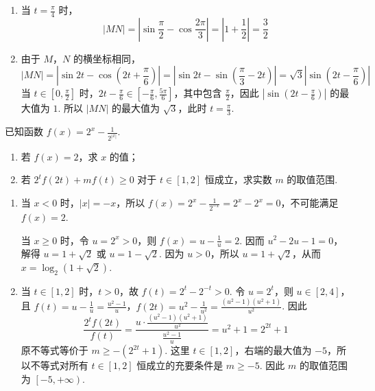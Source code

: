 \begin{solution}
\begin{enumerate}
\item 当 \(t=\frac{\pi}{4}\) 时，
\[
\lvert MN\rvert=\left|\sin\frac{\pi}{2}-\cos\frac{2\pi}{3}\right|=\left|1+\frac{1}{2}\right|=\frac{3}{2}
\]

\item 由于 \(M\)，\(N\) 的横坐标相同，
\[
\lvert MN\rvert=\left|\sin2t-\cos\left(2t+\frac{\pi}{6}\right)\right|=\left|\sin2t-\sin\left(\frac{\pi}{3}-2t\right)\right|=\sqrt{3}\left|\sin\left(2t-\frac{\pi}{6}\right)\right|
\]
当 \(t\in\left[0,\frac{\pi}{2}\right]\) 时，\(2t-\frac{\pi}{6}\in\left[-\frac{\pi}{6},\frac{5\pi}{6}\right]\)，其中包含 \(\frac{\pi}{2}\)，因此 \(\left|\sin\left(2t-\frac{\pi}{6}\right)\right|\) 的最大值为 \(1\). 所以 \(\lvert MN\rvert\) 的最大值为 \(\sqrt{3}\)，此时 \(t=\frac{\pi}{3}\).
\end{enumerate}
\end{solution}

\begin{problem}
已知函数 \(f(x) = 2^x - \frac{1}{2^{|x|}}\).

\begin{enumerate}
\item 若 \(f(x) = 2\)，求 \(x\) 的值；
\item 若 \(2^{t}f(2t) + mf(t) \geqslant 0\) 对于 \(t \in \left[1,2\right]\) 恒成立，求实数 \(m\) 的取值范围.
\end{enumerate}
\end{problem}

\begin{solution}
\begin{enumerate}
\item 当 \(x<0\) 时，\(|x|=-x\)，所以 \(f(x)=2^x-\frac{1}{2^{-x}}=2^x-2^x=0\)，不可能满足 \(f(x)=2\).

当 \(x\geqslant0\) 时，令 \(u=2^x>0\)，则 \(f(x)=u-\frac{1}{u}=2\). 因而
\(u^2-2u-1=0\)，
解得 \(u=1+\sqrt{2}\) 或 \(u=1-\sqrt{2}\). 因为 \(u>0\)，所以 \(u=1+\sqrt{2}\)，从而
\(x=\log_{2}(1+\sqrt{2})\).

\item 当 \(t\in\left[1,2\right]\) 时，\(t>0\)，故 \(f(t)=2^t-2^{-t}>0\). 令 \(u=2^t\)，则 \(u\in\left[2,4\right]\)，且 \(f(t)=u-\frac{1}{u}=\frac{u^2-1}{u}\)，\(f(2t)=u^2-\frac{1}{u^2}=\frac{(u^2-1)(u^2+1)}{u^2}\).
因此
\[
\frac{2^tf(2t)}{f(t)}
=\frac{u\cdot\frac{(u^2-1)(u^2+1)}{u^2}}{\frac{u^2-1}{u}}=u^2+1=2^{2t}+1
\]
原不等式等价于 \(m\geqslant-(2^{2t}+1)\).
这里 \(t\in\left[1,2\right]\)，右端的最大值为 \(-5\)，所以不等式对所有 \(t\in\left[1,2\right]\) 恒成立的充要条件是 \(m\geqslant-5\). 因此 \(m\) 的取值范围为 \(\left[-5,+\infty\right)\).
\end{enumerate}
\end{solution}

